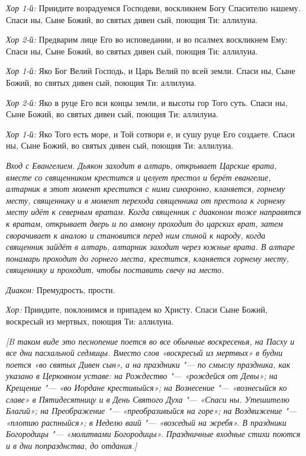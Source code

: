 \begin{mymulticols}
{\itshape Хор 1-й:} Приидите возрадуемся Господеви, воскликнем Богу Спасителю нашему. Спаси ны, Сыне Божий, во святых дивен сый, поющия Ти: аллилуиа. 

{\itshape Хор 2-й:} Предварим лице Его во исповедании, и во псалмех воскликнем Ему: Спаси ны, Сыне Божий, во святых дивен сый, поющия Ти: аллилуиа. 

{\itshape Хор 1-й:} Яко Бог Велий Господь, и Царь Велий по всей земли. Спаси ны, Сыне Божий, во святых дивен сый, поющия Ти: аллилуиа. 

{\itshape Хор 2-й:} Яко в руце Его вси концы земли, и высоты гор Того суть. Спаси ны, Сыне Божий, во святых дивен сый, поющия Ти: аллилуиа. 

{\itshape Хор 1-й:} Яко Того есть море, и Той сотвори е, и сушу руце Его создаете. Спаси ны, Сыне Божий, во святых дивен сый, поющия Ти: аллилуиа. 


{\itshape Вход с Евангелием. Дьякон заходит в алтарь, открывает Царские врата, вместе со священником крестится и целует престол и берёт евангелие, алтарник в этот момент крестится с ними синхронно, кланяется, горнему месту, священнику и в момент перехода священника от престола к горнему месту идёт к северным вратам. Когда священник с диаконом тоже направятся к вратам, открывает дверь и по амвону проходит до царских врат, затем сворачивает к аналою и становится перед ним спиной к народу, когда священник зайдёт в алтарь, алтарник заходит через южные врата. В алтаре понамарь проходит до горнего места, крестится, кланяется горнему месту, священнику и проходит, чтобы поставить свечу на место.}

{\itshape Диакон:} Премудрость, прости.

{\itshape Хор:} Приидите, поклонимся и припадем ко Христу. Спаси Сыне Божий, воскресый из мертвых, поющия Ти: аллилуиа.

{\itshape [B таком виде это песнопение поется во все обычные воскресенья, на Пасху и все дни пасхальной седмицы. Вместо слов «воскресый из мертвых» в будни поется «во святых Дивен сын», а на праздники "--- по смыслу праздника, как указано в Церковном уставе: на Рождество "--- «рождейся от Девы»; на Крещение "--- «во Иордане крестивыйся»; на Вознесение "--- «вознесыйся ко славе» в Пятидесятницу и в День Святого Духа "--- «Спаси ны. Утешителю Благий»; на Преображение "--- «преобразивыйся на горе»; на Воздвижение "--- «плотию распныйся»; в Неделю ваий "--- «возседый на жребя». В праздники Богородицы "--- «молитвами Богородицы». Праздничные входные стихи поются и в дни попразднства, до отдания.]}


\end{mymulticols}
